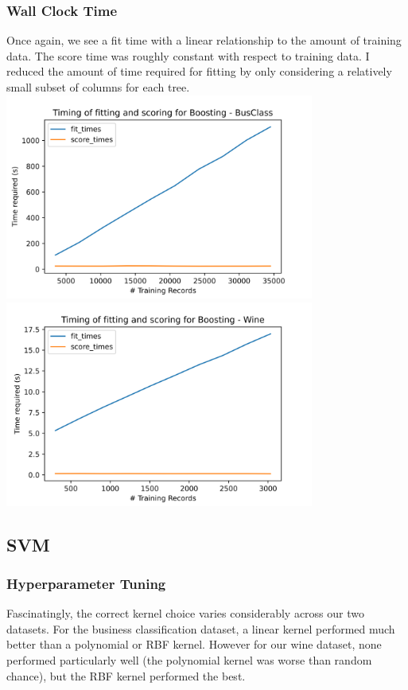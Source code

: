 \documentclass[
	letterpaper, %
]{jdf}
\begin{document}
\subsubsection{Wall Clock Time}
Once again, we see a fit time with a linear relationship to the amount of training data. The score time was roughly constant with respect to training data. I reduced the amount of time required for fitting by only considering a relatively small subset of columns for each tree.
\includegraphics[width=4in]{Figures/BusClass-0920/GBM/time_curve.png}
\includegraphics[width=4in]{Figures/Wine-0921/GBM/time_curve.png}


\subsection{SVM}

\subsubsection{Hyperparameter Tuning}

Fascinatingly, the correct kernel choice varies considerably across our two datasets. For the business classification dataset, a linear kernel performed much better than a polynomial or RBF kernel. However for our wine dataset, none performed particularly well (the polynomial kernel was worse than random chance), but the RBF kernel performed the best.
\end{document}
